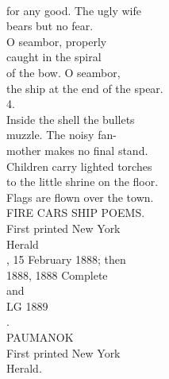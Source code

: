 \documentclass[smalldemyvopaper,11pt,twoside,onecolumn,openright,extrafontsizes]{memoir}
\begin{document}
\\for any good. The ugly wife
\\bears but no fear.
\\O seambor, properly
\\caught in the spiral
\\of the bow. O seambor,
\\the ship at the end of the spear.
\\4.
\\Inside the shell the bullets
\\muzzle. The noisy fan-
\\mother makes no final stand.
\\Children carry lighted torches
\\to the little shrine on the floor.
\\Flags are flown over the town.
\\FIRE CARS SHIP POEMS.
\\First printed New York
\\Herald
\\, 15 February 1888; then
\\1888, 1888 Complete
\\and
\\LG 1889
\\.
\\PAUMANOK
\\First printed New York
\\Herald.
\end{document}
